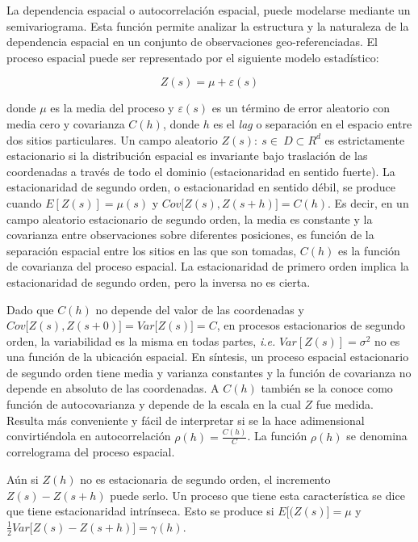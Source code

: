 \documentclass[11pt,b5paper,]{krantz}
\begin{document}
La dependencia espacial o autocorrelación espacial, puede modelarse
mediante un semivariograma. Esta función permite analizar la estructura
y la naturaleza de la dependencia espacial en un conjunto de
observaciones geo-referenciadas. El proceso espacial puede ser
representado por el siguiente modelo estadístico:

\[Z\left(s\right)=\mu+\varepsilon\left(s\right)\]

donde \(\mu\) es la media del proceso y \(\varepsilon\left(s\right)\) es
un término de error aleatorio con media cero y covarianza \(C(h)\),
donde \(h\) es el \emph{lag} o separación en el espacio entre dos sitios
particulares. Un campo aleatorio \({Z(s):\ s\in\ D\subset R^d}\) es
estrictamente estacionario si la distribución espacial es invariante
bajo traslación de las coordenadas a través de todo el dominio
(estacionaridad en sentido fuerte). La estacionaridad de segundo orden,
o estacionaridad en sentido débil, se produce cuando
\(E\left[Z\left(s\right)\right]=\mu\left(s\right)\) y
\(Cov\big[Z(s),Z(s+h)\big]=C(h)\). Es decir, en un campo aleatorio
estacionario de segundo orden, la media es constante y la covarianza
entre observaciones sobre diferentes posiciones, es función de la
separación espacial entre los sitios en las que son tomadas, \(C(h)\) es
la función de covarianza del proceso espacial. La estacionaridad de
primero orden implica la estacionaridad de segundo orden, pero la
inversa no es cierta.

Dado que \(C(h)\) no depende del valor de las coordenadas y
\(Cov\big[Z(s),Z(s+0)\big]= Var \big[Z(s)\big]=C\), en procesos
estacionarios de segundo orden, la variabilidad es la misma en todas
partes, \emph{i.e.} \(Var [Z(s)]=\sigma^2\) no es una función de la
ubicación espacial. En síntesis, un proceso espacial estacionario de
segundo orden tiene media y varianza constantes y la función de
covarianza no depende en absoluto de las coordenadas. A
\(C\left(h\right)\) también se la conoce como función de autocovarianza
y depende de la escala en la cual \(Z\) fue medida. Resulta más
conveniente y fácil de interpretar si se la hace adimensional
convirtiéndola en autocorrelación \(\rho\left(h\right)=\frac{C(h)}{C}\).
La función \(\rho\left(h\right)\) se denomina correlograma del proceso
espacial.

Aún si \(Z(h)\) no es estacionaria de segundo orden, el incremento
\(Z(s)-Z(s+h)\) puede serlo. Un proceso que tiene esta característica se
dice que tiene estacionaridad intrínseca. Esto se produce si
\(E\big[(Z(s)\big]=\mu\) y
\(\frac{1}{2}Var\big[Z(s)-Z(s+h)\big]=\gamma(h)\).
\end{document}
